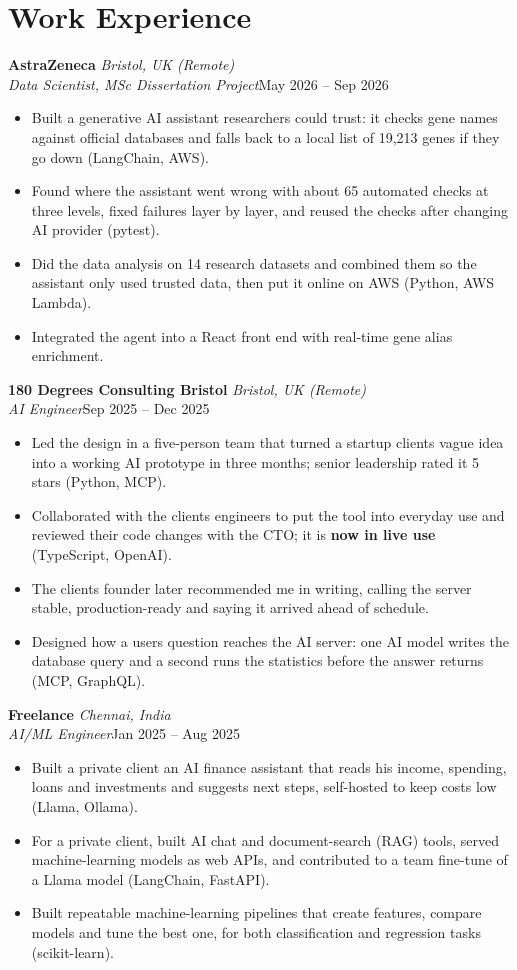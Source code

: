 \documentclass[a4paper,11pt]{article}
\newcommand{\role}[4]{%
  \textbf{#1}{\color{muted}\,\textperiodcentered\,\textit{#2}}\\
  \textit{#4}\hfill{\color{muted}#3}\par}
\newcommand{\gap}{\vspace{5pt}}
\newcommand{\num}[1]{\textbf{#1}}   %
\begin{document}
\section{Work Experience}
\role{AstraZeneca}{Bristol, UK (Remote)}{May 2026 – Sep 2026}{Data Scientist, MSc Dissertation Project}
\begin{itemize}
  \item Built a generative AI assistant researchers could trust: it checks gene names against official databases and falls back to a local list of 19,213 genes if they go down (LangChain, AWS).
  \item Found where the assistant went wrong with about 65 automated checks at three levels, fixed failures layer by layer, and reused the checks after changing AI provider (pytest).
  \item Did the data analysis on 14 research datasets and combined them so the assistant only used trusted data, then put it online on AWS (Python, AWS Lambda).
  \item Integrated the agent into a React front end with real-time gene alias enrichment.
\end{itemize}
\gap
{}
\role{180 Degrees Consulting Bristol}{Bristol, UK (Remote)}{Sep 2025 – Dec 2025}{AI Engineer}
\begin{itemize}
  \item Led the design in a five-person team that turned a startup client\textquotesingle{}s vague idea into a working AI prototype in three months; senior leadership rated it 5 stars (Python, MCP).
  \item Collaborated with the client\textquotesingle{}s engineers to put the tool into everyday use and reviewed their code changes with the CTO; it is \num{now in live use} (TypeScript, OpenAI).
  \item The client\textquotesingle{}s founder later recommended me in writing, calling the server \textquotesingle{}stable, production-ready\textquotesingle{} and saying it arrived ahead of schedule.
  \item Designed how a user\textquotesingle{}s question reaches the AI server: one AI model writes the database query and a second runs the statistics before the answer returns (MCP, GraphQL).
\end{itemize}
\gap
{}
\role{Freelance}{Chennai, India}{Jan 2025 – Aug 2025}{AI/ML Engineer}
\begin{itemize}
  \item Built a private client an AI finance assistant that reads his income, spending, loans and investments and suggests next steps, self-hosted to keep costs low (Llama, Ollama).
  \item For a private client, built AI chat and document-search (RAG) tools, served machine-learning models as web APIs, and contributed to a team fine-tune of a Llama model (LangChain, FastAPI).
  \item Built repeatable machine-learning pipelines that create features, compare models and tune the best one, for both classification and regression tasks (scikit-learn).
\end{itemize}
\end{document}
